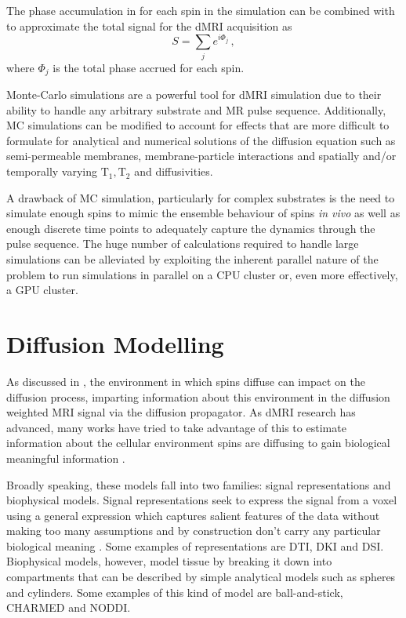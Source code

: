 The phase accumulation in  for each spin in the simulation can be combined with  to approximate the total signal for the \ac{dMRI} acquisition as
\begin{equation}
  S = \sum_j e^{i\Phi_j}\,,
  \label{eq:MCsignal}
\end{equation}
where $\Phi_j$ is the total phase accrued for each spin. 

Monte-Carlo simulations are a powerful tool for \ac{dMRI} simulation due to their ability to handle any arbitrary substrate and MR pulse sequence.
Additionally, \ac{MC} simulations can be modified to account for effects that are more difficult to formulate for analytical and numerical solutions of the diffusion equation such as semi-permeable membranes, membrane-particle interactions and spatially and/or temporally varying $\mathrm{T_1, T_2}$ and diffusivities.

A drawback of \ac{MC} simulation, particularly for complex substrates is the need to simulate enough spins to mimic the ensemble behaviour of spins \emph{in vivo} as well as enough discrete time points to adequately capture the dynamics through the pulse sequence.
The huge number of calculations required to handle large simulations can be alleviated by exploiting the inherent parallel nature of the problem to run simulations in parallel on a \ac{CPU} cluster or, even more effectively, a GPU cluster.

\section{Diffusion Modelling}
\label{sec:bg_diffusion-modelling}
As discussed in , the environment in which spins diffuse can impact on the diffusion process, imparting information about this environment in the diffusion weighted \ac{MRI} signal via the diffusion propagator. As \ac{dMRI} research has advanced, many works have tried to take advantage of this to estimate information about the cellular environment spins are diffusing to gain biological meaningful information \cite{Novikov2019,Jelescu2017,Alexander2017}.

Broadly speaking, these models fall into two families: signal representations and biophysical models. Signal representations seek to express the signal from a voxel using a general expression which captures salient features of the data without making too many assumptions and by construction don't carry any particular biological meaning \cite{Novikov2019}. Some examples of representations are \ac{DTI}\cite{basserMRDiffusionTensor1994}, \ac{DKI}\cite{Jensen2005} and \ac{DSI}\cite{Wedeen2005}. Biophysical models, however, model tissue by breaking it down into compartments that can be described by simple analytical models such as spheres and cylinders. Some examples of this kind of model are ball-and-stick\cite{Behrens2003}, \ac{CHARMED}\cite{Assaf2005} and \ac{NODDI}\cite{Zhang2012}.

